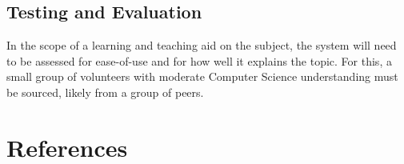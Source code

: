 \documentclass{article}
\begin{document}
\subsection{Testing and Evaluation}
In the scope of a learning and teaching aid on the subject, the system will need to be assessed for ease-of-use and for how well it explains the topic. For this, a small group of volunteers with moderate Computer Science understanding must be sourced, likely from a group of peers.


\section{References}




\end{document}
